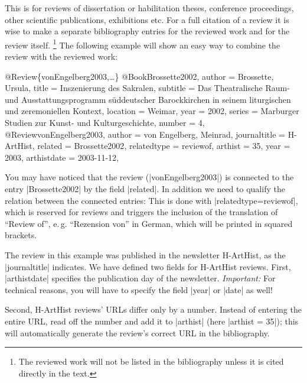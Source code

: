 \documentclass[a4paper,
10pt,
ngerman,
english
]{ltxdoc}
\begin{document}
This is for reviews of dissertation or habilitation theses, conference proceedings, other scientific publications, exhibitions etc.
For a full citation of a review it is wise to make a separate bibliography entries for the reviewed work and for the review itself.%
\footnote{The reviewed work will not be listed in the bibliography unless it is cited directly in the text.}
The following example will show an easy way to combine the review with the reviewed work:
\begin{bibexample}[label=vonEngelberg2003]{{@}Review\{vonEngelberg2003,…\}}
@Book{Brossette2002,
  author   = {Brossette, Ursula},
  title    = {Inszenierung des Sakralen},
  subtitle = {Das Theatralische Raum- und Ausstattungsprogramm süddeutscher Barockkirchen in seinem liturgischen und zeremoniellen Kontext},
  location = {Weimar},
  year     = {2002},
  series   = {Marburger Studien zur Kunst- und Kulturgeschichte},
  number   = {4},
}
@Review{vonEngelberg2003,
  author       = {von Engelberg, Meinrad},
  journaltitle = {H-ArtHist},
  related      = {Brossette2002},
  relatedtype  = {reviewof},
  arthist      = {35},
  year         = {2003},
  arthistdate  = {2003-11-12},
}\end{bibexample}
You may have noticed that the review (|vonEngelberg2003|) is connected to the entry |Brossette2002| by the field |related|.
In addition we need to qualify the relation between the connected entries:
This is done with |relatedtype={reviewof}|, which is reserved for reviews and triggers the inclusion of the translation of \enquote{Review of}, e.\,g. \enquote{Rezension von} in German, which will be printed in squared brackets.

The review in this example was published in the newsletter H-ArtHist, as the |journaltitle| indicates. We have defined two fields for H-ArtHist reviews. First, |arthistdate| specifies the publication day of the newsletter. \emph{Important:} For technical reasons, you will have to specify the field |year| or |date| as well!

Second, H-ArtHist reviews' URLs differ only by a number. Instead of entering the entire URL, read off the number and add it to |arthist| (here |arthist = {35}|); this will automatically generate the review's correct URL in the bibliography.
\end{document}

